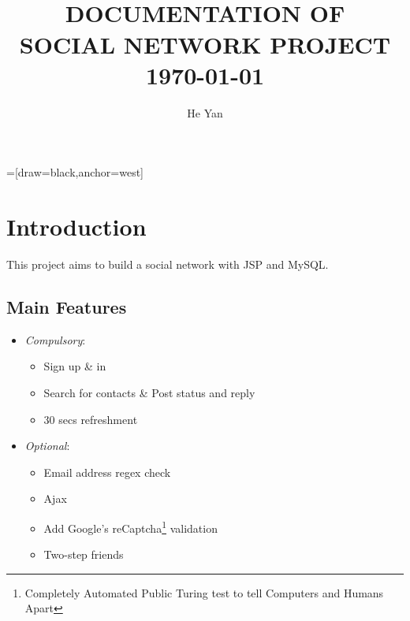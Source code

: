 


=[draw=black,anchor=west]
\title{
        \HRule{2pt}\\
        \LARGE \textbf{\uppercase{Documentation of\\ Social Network Project}}
        \HRule{2pt} \\ [0.5cm]
        \normalsize \today \vspace*{5\baselineskip}}

\date{}

\author{He Yan}

\maketitle
\tableofcontents
\setcounter{page}{0}
\thispagestyle{empty}
\newpage

\section{Introduction}

This project aims to build a social network with JSP and MySQL.

\subsection{Main Features}
\begin{itemize}
	\item \emph{Compulsory}:
		\begin{itemize}
			\item Sign up \& in
			\item Search for contacts \& Post status and reply
			\item 30 secs refreshment
		\end{itemize}
	\item \emph{Optional}:
		\begin{itemize}
			\item Email address regex check
			\item Ajax
			\item Add Google's reCaptcha\footnote{Completely Automated Public Turing test to tell Computers and Humans Apart} validation
			\item Two-step friends
		\end{itemize}
\end{itemize}

